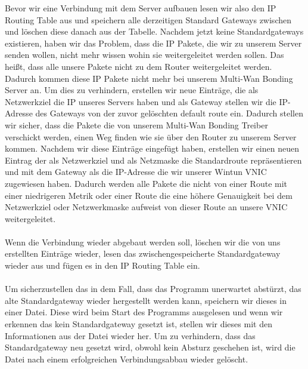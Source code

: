 Bevor wir eine Verbindung mit dem Server aufbauen lesen wir also den IP Routing Table aus und speichern alle derzeitigen Standard Gateways zwischen und löschen diese danach aus der Tabelle. Nachdem jetzt keine Standardgateways existieren, haben wir das Problem, dass die IP Pakete, die wir zu unserem Server senden wollen, nicht mehr wissen wohin sie weitergeleitet werden sollen. Das heißt, dass alle unsere Pakete nicht zu dem Router weitergeleitet werden. Dadurch kommen diese IP Pakete nicht mehr bei unserem Multi-Wan Bonding Server an. Um dies zu verhindern, erstellen wir neue Einträge, die als Netzwerkziel die IP unseres Servers haben und als Gateway stellen wir die IP-Adresse des Gateways von der zuvor gelöschten default route ein. Dadurch stellen wir sicher, dass die Pakete die von unserem Multi-Wan Bonding Treiber verschickt werden, einen Weg finden wie sie über den Router zu unserem Server kommen. Nachdem wir diese Einträge eingefügt haben, erstellen wir einen neuen Eintrag der als Netzwerkziel und als Netzmaske die Standardroute repräsentieren und mit dem Gateway als die IP-Adresse die wir unserer Wintun VNIC zugewiesen haben. Dadurch werden alle Pakete die nicht von einer Route mit einer niedrigeren Metrik oder einer Route die eine höhere Genauigkeit bei dem Netzwerkziel oder Netzwerkmaske aufweist von dieser Route an unsere VNIC weitergeleitet.
\\\\
Wenn die Verbindung wieder abgebaut werden soll, löschen wir die von uns erstellten Einträge wieder, lesen das zwischengespeicherte Standardgateway wieder aus und fügen es in den IP Routing Table ein.
\\\\
Um sicherzustellen das in dem Fall, dass das Programm unerwartet abstürzt, das alte Standardgateway wieder hergestellt werden kann, speichern wir dieses in einer Datei. Diese wird beim Start des Programms ausgelesen und wenn wir erkennen das kein Standardgateway gesetzt ist, stellen wir dieses mit den Informationen aus der Datei wieder her. Um zu verhindern, dass das Standardgateway neu gesetzt wird, obwohl kein Absturz geschehen ist, wird die Datei nach einem erfolgreichen Verbindungsabbau wieder gelöscht.

